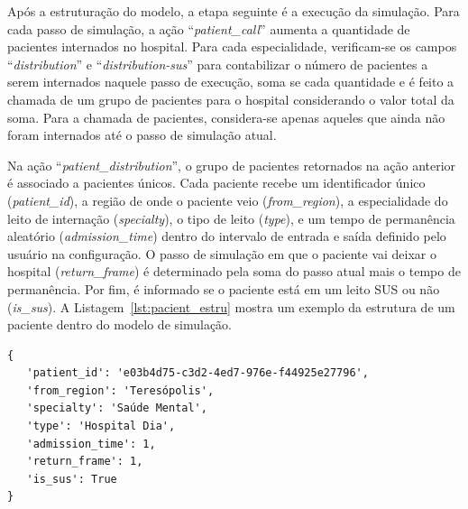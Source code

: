 Após a estruturação do modelo, a etapa seguinte é a execução da simulação. Para cada passo de simulação, a ação ``\textit{patient\_call}'' aumenta a quantidade de pacientes internados no hospital. Para cada especialidade, verificam-se os campos ``\textit{distribution}'' e ``\textit{distribution-sus}'' para contabilizar o número de pacientes a serem internados naquele passo de execução, soma se cada quantidade e é feito a chamada de um grupo de pacientes para o hospital considerando o valor total da soma. Para a chamada de pacientes, considera-se apenas aqueles que ainda não foram internados até o passo de simulação atual.

Na ação ``\textit{patient\_distribution}'', o grupo de pacientes retornados na ação anterior é associado a pacientes únicos. Cada paciente recebe um identificador único (\textit{patient\_id}), a região de onde o paciente veio (\textit{from\_region}), a especialidade do leito de internação (\textit{specialty}), o tipo de leito (\textit{type}), e um tempo de permanência aleatório (\textit{admission\_time}) dentro do intervalo de entrada e saída definido pelo usuário na configuração. O passo de simulação em que o paciente vai deixar o hospital (\textit{return\_frame}) é determinado pela soma do passo atual mais o tempo de permanência. Por fim, é informado se o paciente está em um leito SUS ou não (\textit{is\_sus}). A Listagem~\ref{lst:pacient_estru} mostra um exemplo da estrutura de um paciente dentro do modelo de simulação.

\begin{listing}
\begin{verbatim}     
{
   'patient_id': 'e03b4d75-c3d2-4ed7-976e-f44925e27796', 
   'from_region': 'Teresópolis', 
   'specialty': 'Saúde Mental', 
   'type': 'Hospital Dia', 
   'admission_time': 1, 
   'return_frame': 1, 
   'is_sus': True
}
\end{verbatim}
\caption{Exemplo da estrutura de um paciente na simulação.} 
\label{lst:pacient_estru}
\end{listing}

